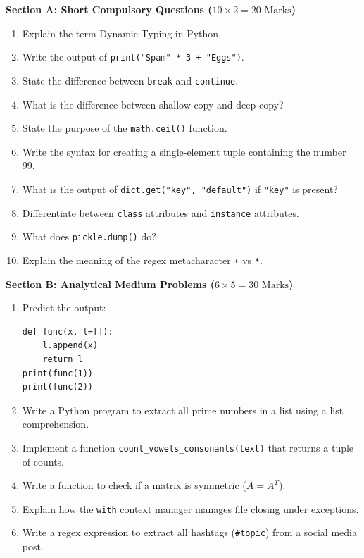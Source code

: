 \begin{mockexam}
\noindent\textbf{Section A: Short Compulsory Questions ($10 \times 2 = 20\text{ Marks}$)}
\begin{enumerate}[leftmargin=1.5em]
    \item Explain the term Dynamic Typing in Python.
    \item Write the output of \texttt{print("Spam" * 3 + "Eggs")}.
    \item State the difference between \texttt{break} and \texttt{continue}.
    \item What is the difference between shallow copy and deep copy?
    \item State the purpose of the \texttt{math.ceil()} function.
    \item Write the syntax for creating a single-element tuple containing the number 99.
    \item What is the output of \texttt{dict.get("key", "default")} if \texttt{"key"} is present?
    \item Differentiate between \texttt{class} attributes and \texttt{instance} attributes.
    \item What does \texttt{pickle.dump()} do?
    \item Explain the meaning of the regex metacharacter \texttt{+} vs \texttt{*}.
\end{enumerate}

\medskip
\noindent\textbf{Section B: Analytical Medium Problems ($6 \times 5 = 30\text{ Marks}$)}
\begin{enumerate}[leftmargin=1.5em, start=11]
    \item Predict the output:
    \begin{lstlisting}[language=Python3]
def func(x, l=[]):
    l.append(x)
    return l
print(func(1))
print(func(2))
    \end{lstlisting}
    \item Write a Python program to extract all prime numbers in a list using a list comprehension.
    \item Implement a function \texttt{count\_vowels\_consonants(text)} that returns a tuple of counts.
    \item Write a function to check if a matrix is symmetric ($A = A^T$).
    \item Explain how the \texttt{with} context manager manages file closing under exceptions.
    \item Write a regex expression to extract all hashtags (\texttt{\#topic}) from a social media post.
\end{enumerate}


\end{mockexam}
